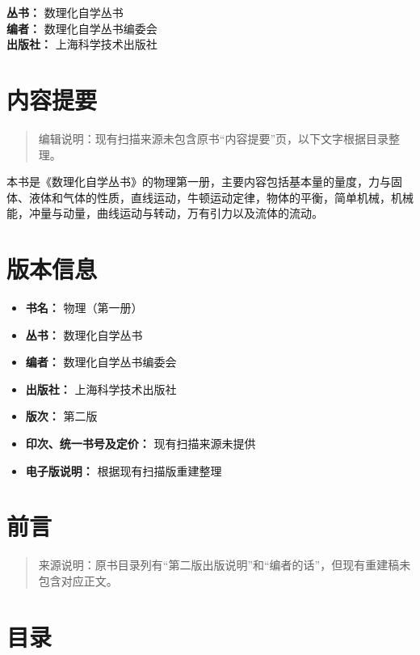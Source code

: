 \textbf{丛书：} 数理化自学丛书\\
\textbf{编者：} 数理化自学丛书编委会\\
\textbf{出版社：} 上海科学技术出版社

\chapter{内容提要}\label{ux5185ux5bb9ux63d0ux8981}

\begin{quote}
编辑说明：现有扫描来源未包含原书``内容提要''页，以下文字根据目录整理。
\end{quote}

本书是《数理化自学丛书》的物理第一册，主要内容包括基本量的量度，力与固体、液体和气体的性质，直线运动，牛顿运动定律，物体的平衡，简单机械，机械能，冲量与动量，曲线运动与转动，万有引力以及流体的流动。

\chapter{版本信息}\label{ux7248ux672cux4fe1ux606f}

\begin{itemize}
\tightlist
\item
  \textbf{书名：} 物理（第一册）
\item
  \textbf{丛书：} 数理化自学丛书
\item
  \textbf{编者：} 数理化自学丛书编委会
\item
  \textbf{出版社：} 上海科学技术出版社
\item
  \textbf{版次：} 第二版
\item
  \textbf{印次、统一书号及定价：} 现有扫描来源未提供
\item
  \textbf{电子版说明：} 根据现有扫描版重建整理
\end{itemize}

\chapter{前言}\label{ux524dux8a00}

\begin{quote}
来源说明：原书目录列有``第二版出版说明''和``编者的话''，但现有重建稿未包含对应正文。
\end{quote}

\chapter{目录}\label{ux76eeux5f55}


